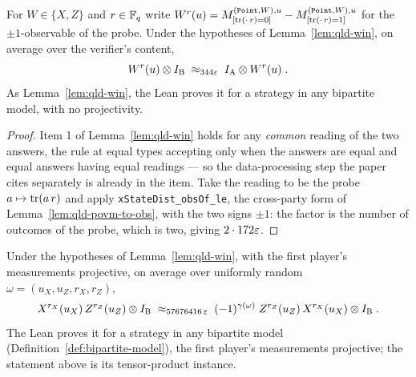 \effortEasy

\begin{lemma}
\label{lem:qld-obs-consistency}
\leanok
For $W \in \{X, Z\}$ and $r \in \mathbb{F}_q$ write
$W^r(u) = M^{(\mathtt{Point}, W), u}_{[\operatorname{tr}(\cdot\, r) = 0]}
  - M^{(\mathtt{Point}, W), u}_{[\operatorname{tr}(\cdot\, r) = 1]}$
for the $\pm 1$-observable of the probe. Under the hypotheses of Lemma~\ref{lem:qld-win}, on
average over the verifier's content,
\begin{equation*}
  W^r(u) \otimes I_{\textsc{B}} \;\approx_{344\varepsilon}\; I_{\textsc{A}} \otimes W^r(u)\;.
\end{equation*}
As Lemma~\ref{lem:qld-win}, the Lean proves it for a strategy in any bipartite model, with no
projectivity.
\end{lemma}

\begin{proof}
\leanok
{}
Item 1 of Lemma~\ref{lem:qld-win} holds for any \emph{common} reading of the two answers, the
rule at equal types accepting only when the answers are equal and equal answers having equal
readings --- so the data-processing step the paper cites separately is already in the item. Take
the reading to be the probe $a \mapsto \operatorname{tr}(a\,r)$ and apply
\texttt{xStateDist\_obsOf\_le}, the cross-party form of Lemma~\ref{lem:qld-povm-to-obs}, with
the two signs $\pm 1$: the factor is the number of outcomes of the probe, which is two, giving
$2 \cdot 172\varepsilon$.
\end{proof}

\effortHard

\begin{lemma}
\label{lem:qld-obs-commutation}
\leanok
Under the hypotheses of Lemma~\ref{lem:qld-win}, with the first player's measurements projective,
on average over uniformly random $\omega = (u_X, u_Z, r_X, r_Z)$,
\begin{equation}
  \label{eq:qld-obs-commutation-bp}
  X^{r_X}(u_X)\, Z^{r_Z}(u_Z) \otimes I_{\textsc{B}}
    \;\approx_{57676416\,\varepsilon}\;
  (-1)^{\gamma(\omega)}\; Z^{r_Z}(u_Z)\, X^{r_X}(u_X) \otimes I_{\textsc{B}}\;.
\end{equation}
The Lean proves it for a strategy in any bipartite model (Definition~\ref{def:bipartite-model}),
the first player's measurements projective; the statement above is its tensor-product instance.
\end{lemma}

